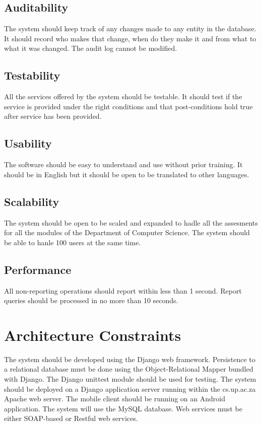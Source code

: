 \documentclass[a4paper]{article}
\begin{document}
\subsection{Auditability}

The system should keep track of any changes made to any entity in the database. It should record who makes that change, when do they make it and from what to what it was changed. The audit log cannot be modified.

\subsection{Testability}

All the services offered by the system should be testable. It should test if the service is provided under the right conditions and that post-conditions hold true after service has been provided. 

\subsection{Usability}

The software should be easy to understand and use without prior training. It should be in English but it should be open to be translated to other languages.

\subsection{Scalability}

The system should be open to be scaled and expanded to hadle all the assesments for all the modules of the Department of Computer Science. The system should be able to hanle 100 users at the same time.
	
\subsection{Performance}

All non-reporting operations should report within less than 1 second. Report queries should be processed in no more than 10 seconds.

\section{Architecture Constraints}
	
The system should be developed using the Django web framework. Persistence to a relational database must be done using the Object-Relational Mapper bundled with Django. The Django unittest module should be used for testing. The system should be deployed on a Django application server running within the cs.up.ac.za Apache web server. The mobile client should be running on an Android application. The system will use the MySQL database. Web services must be either SOAP-based or Restful web services.
\end{document}
